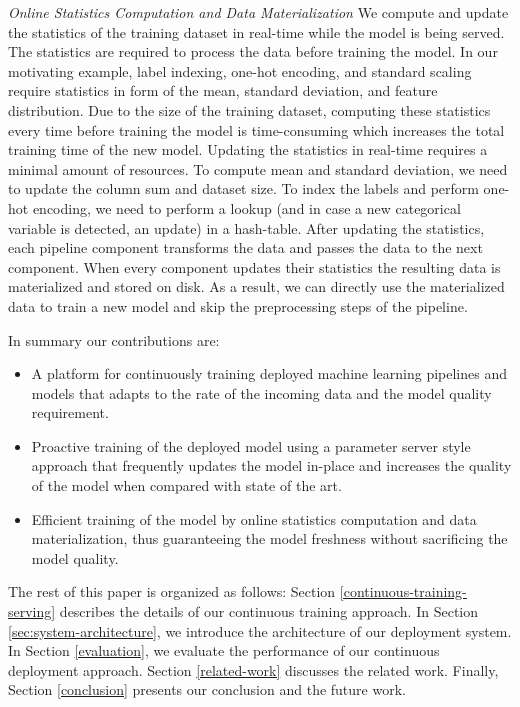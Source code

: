\textit{Online Statistics Computation and Data Materialization}
We compute and update the statistics of the training dataset in real-time while the model is being served. 
The statistics are required to process the data before training the model.
In our motivating example, label indexing, one-hot encoding, 
and standard scaling require statistics in form of the mean, standard deviation, and feature distribution.
Due to the size of the training dataset, computing these statistics every time before training the model is time-consuming which increases the total training time of the new model.
Updating the statistics in real-time requires a minimal amount of resources. 
To compute mean and standard deviation, we need to update the column sum and dataset size.
To index the labels and perform one-hot encoding, we need to perform a lookup (and in case a new categorical variable is detected, an update) in a hash-table. 
After updating the statistics, each pipeline component transforms the data and passes the data to the next component.
When every component updates their statistics the resulting data is materialized and stored on disk.
As a result, we can directly use the materialized data to train a new model and skip the preprocessing steps of the pipeline.

In summary our contributions are:
\begin{itemize}
\item A platform for continuously training deployed machine learning pipelines and models that adapts to the rate of the incoming data and the model quality requirement.
\item Proactive training of the deployed model using a parameter server style approach that frequently updates the model in-place and increases the quality of the model when compared with state of the art.
\item Efficient training of the model by online statistics computation and data materialization, thus guaranteeing the model freshness without sacrificing the model quality.
\end{itemize}

The rest of this paper is organized as follows:
Section \ref{continuous-training-serving} describes the details of our continuous training approach.
In Section \ref{sec:system-architecture}, we introduce the architecture of our deployment system.
In Section \ref{evaluation}, we evaluate the performance of our continuous deployment approach.
Section \ref {related-work} discusses the related work.
Finally, Section \ref{conclusion} presents our conclusion and the future work.
